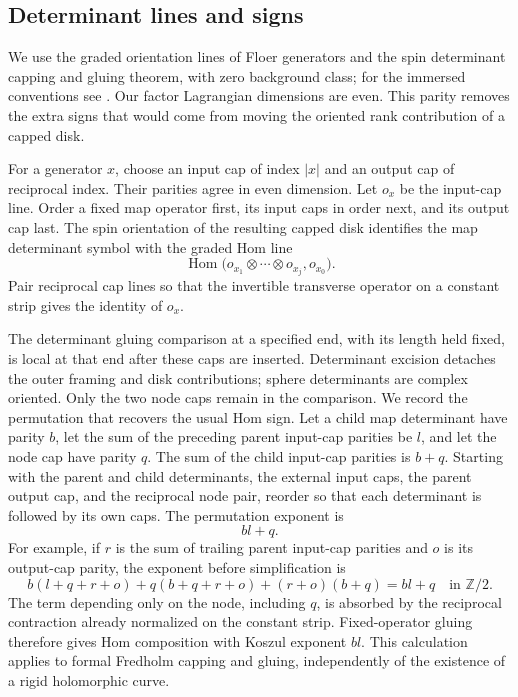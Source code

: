 \documentclass[11pt]{article}
\numberwithin{equation}{section}
\theoremstyle{definition}
\theoremstyle{remark}
\newcommand{\Z}{\mathbb Z}
\DeclareMathOperator{\Hom}{Hom}
\begin{document}
\subsection{Determinant lines and signs}
\label{comp:orientations}

We use the graded orientation lines of Floer generators and the
spin determinant capping and gluing theorem, with zero background
class; for the immersed conventions see
\cite[Sections~4--5]{AkahoJoyce}.  Our factor Lagrangian dimensions
are even.  This parity removes the extra signs that would come
from moving the oriented rank contribution of a capped disk.

For a generator $x$, choose an input cap of index $|x|$ and an
output cap of reciprocal index.  Their parities agree in even
dimension.  Let $o_x$ be the input-cap line.  Order a fixed map
operator first, its input caps in order next, and its output cap
last.  The spin orientation of the resulting capped disk
identifies the map determinant symbol with the graded Hom line
\[
 \Hom\bigl(o_{x_1}\otimes\cdots\otimes o_{x_j},o_{x_0}\bigr).
\]
Pair reciprocal cap lines so that the invertible transverse
operator on a constant strip gives the identity of $o_x$.

The determinant gluing comparison at a specified end, with its
length held fixed, is local at that end after these caps are
inserted.  Determinant excision detaches the outer framing and
disk contributions; sphere determinants are complex oriented.
Only the two node caps remain in the comparison.  We record the
permutation that recovers the usual Hom sign.  Let a child map
determinant have parity $b$, let the sum of the preceding parent
input-cap parities be $l$, and let the node cap have parity $q$.
The sum of the child input-cap parities is $b+q$.  Starting with
the parent and child determinants, the external input caps, the
parent output cap, and the reciprocal node pair, reorder so that
each determinant is followed by its own caps.  The permutation
exponent is
\[
 bl+q.
\]
For example, if $r$ is the sum of trailing parent input-cap
parities and $o$ is its output-cap parity, the exponent before
simplification is
\[
 b(l+q+r+o)+q(b+q+r+o)+(r+o)(b+q)=bl+q
 \quad\text{in }\Z/2.
\]
The term depending only on the node, including $q$, is absorbed by
the reciprocal contraction already normalized on the constant
strip.  Fixed-operator gluing therefore gives Hom composition
with Koszul exponent $bl$.  This calculation applies to formal
Fredholm capping and gluing, independently of the existence of a
rigid holomorphic curve.
\end{document}
